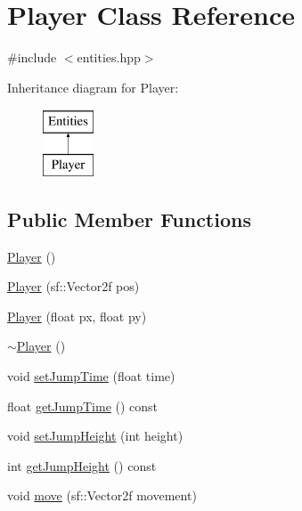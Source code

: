 \hypertarget{classPlayer}{\section{Player Class Reference}
\label{classPlayer}
}


{\ttfamily \#include $<$entities.\-hpp$>$}

Inheritance diagram for Player\-:\begin{figure}[H]
\begin{center}
\leavevmode
\includegraphics[height=2.000000cm]{classPlayer}
\end{center}
\end{figure}
\subsection*{Public Member Functions}
\begin{DoxyCompactItemize}
\item 
\hyperlink{classPlayer_affe0cc3cb714f6deb4e62f0c0d3f1fd8}{Player} ()
\item 
\hyperlink{classPlayer_a590f9fa9624d8734027fa2b290fa909e}{Player} (sf\-::\-Vector2f pos)
\item 
\hyperlink{classPlayer_ad2d6910c46e7fdf375870da47ae3db5f}{Player} (float px, float py)
\item 
\hyperlink{classPlayer_a749d2c00e1fe0f5c2746f7505a58c062}{$\sim$\-Player} ()
\item 
void \hyperlink{classPlayer_a01c63b9632f8a4f679f2e4cd704f14b9}{set\-Jump\-Time} (float time)
\item 
float \hyperlink{classPlayer_a9165dbc42a8d434d4eb0c64251305855}{get\-Jump\-Time} () const 
\item 
void \hyperlink{classPlayer_aa04cc1ac4ae2b43bfb841929e3d59315}{set\-Jump\-Height} (int height)
\item 
int \hyperlink{classPlayer_a41384c619c72d9cfd1ad6a354e917f8e}{get\-Jump\-Height} () const 
\item 
void \hyperlink{classPlayer_af7dc81f2576b432bc20e4040bb111422}{move} (sf\-::\-Vector2f movement)
\end{DoxyCompactItemize}


